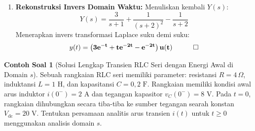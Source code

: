 \documentclass[11pt,a4paper]{article}
\theoremstyle{definition}
\newtheorem{example}{Contoh Soal}[section]
\begin{document}
\begin{enumerate}[leftmargin=*]
    \item \textbf{Rekonstruksi Invers Domain Waktu:}
    Menuliskan kembali $Y(s)$:
    \begin{equation*}
        Y(s) = \frac{3}{s + 1} + \frac{1}{(s + 2)^2} - \frac{1}{s + 2}
    \end{equation*}
    Menerapkan invers transformasi Laplace suku demi suku:
    \begin{equation*}
        y(t) = \mathbf{\left( 3 e^{-t} + t e^{-2t} - e^{-2t} \right) u(t)} \quad \qed
    \end{equation*}
\end{enumerate}

\begin{example}[Solusi Lengkap Transien RLC Seri dengan Energi Awal di Domain $s$]
Sebuah rangkaian RLC seri memiliki parameter: resistansi $R = 4\,\Omega$, induktansi $L = 1\text{ H}$, dan kapasitansi $C = 0{,}2\text{ F}$. Rangkaian memiliki kondisi awal arus induktor $i(0^-) = 2\text{ A}$ dan tegangan kapasitor $v_C(0^-) = 8\text{ V}$. Pada $t = 0$, rangkaian dihubungkan secara tiba-tiba ke sumber tegangan searah konstan $V_{\text{dc}} = 20\text{ V}$. Tentukan persamaan analitis arus transien $i(t)$ untuk $t \ge 0$ menggunakan analisis domain $s$.
\end{example}
\end{document}
